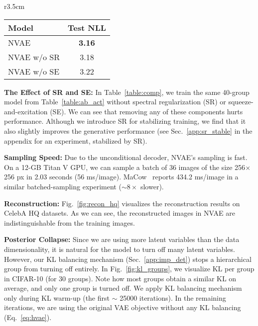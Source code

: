 \documentclass{article}
\begin{document}
\begin{wraptable}{r}{3.5cm}
\vspace{-5mm}
\centering
{\footnotesize
\setlength{\tabcolsep}{2pt}
\caption{\small SR \& SE}\label{table:comp}
    \begin{tabular}{lc}
    \toprule
    Model    & Test NLL  \\
    \midrule
    NVAE          & \bf 3.16  \\
    NVAE w/o SR     & 3.18 \\
    NVAE w/o SE     & 3.22  \\
    \bottomrule
    \end{tabular}
}
\vspace{-8mm}
\end{wraptable}\textbf{The Effect of SR and SE:} In Table~\ref{table:comp}, we train the same 40-group model from Table~\ref{table:ab_act} without spectral regularization (SR) or squeeze-and-excitation (SE). We can see that removing any of these components hurts performance. Although we introduce SR for stabilizing training, we find that it also slightly improves the generative performance (see Sec.~\ref{app:sr_stable} in the appendix for an experiment, stabilized by SR).


\textbf{Sampling Speed:} Due to the unconditional decoder, NVAE's sampling is fast. On a 12-GB Titan V GPU, we can sample a batch of 36 images of the size 256$\times$256 px in 2.03 seconds (56 ms/image). MaCow~\cite{ma19MaCow} reports 434.2 ms/image in a similar batched-sampling experiment ($\sim\!8\times$ slower). 

\textbf{Reconstruction:}
Fig.~\ref{fig:recon_hq} visualizes the reconstruction results on CelebA HQ datasets. As we can see, the reconstructed images in NVAE are indistinguishable from the training images. 

\textbf{Posterior Collapse:}
Since we are using more latent variables than the data dimensionality, it is natural for the model to turn off many latent variables. However, our KL balancing mechanism (Sec.~\ref{app:imp_det}) stops a hierarchical group from turning off entirely. In Fig.~\ref{fig:kl_groups}, we visualize KL per group in CIFAR-10 (for 30 groups). Note how most groups obtain a similar KL on average, and only one group is turned off. We apply KL balancing mechanism only during KL warm-up (the first $\sim$ 25000 iterations). In the remaining iterations, we are using the original VAE objective without any KL balancing (Eq.~\ref{eq:hvae}).
\end{document}
